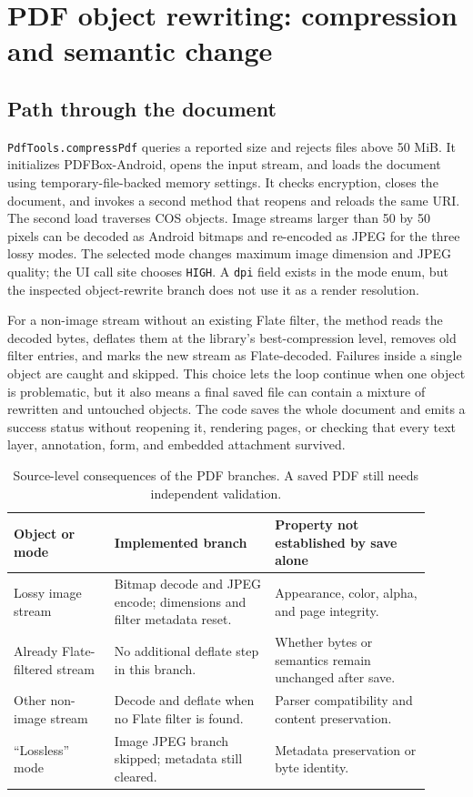\documentclass[10pt,letterpaper]{article}
\begin{document}
\section{PDF object rewriting: compression and semantic change}

\subsection{Path through the document}

\texttt{PdfTools.compressPdf} queries a reported size and rejects files above 50 MiB. It initializes PDFBox-Android, opens the input stream, and loads the document using temporary-file-backed memory settings. It checks encryption, closes the document, and invokes a second method that reopens and reloads the same URI. The second load traverses COS objects. Image streams larger than 50 by 50 pixels can be decoded as Android bitmaps and re-encoded as JPEG for the three lossy modes. The selected mode changes maximum image dimension and JPEG quality; the UI call site chooses \texttt{HIGH}. A \texttt{dpi} field exists in the mode enum, but the inspected object-rewrite branch does not use it as a render resolution.

For a non-image stream without an existing Flate filter, the method reads the decoded bytes, deflates them at the library's best-compression level, removes old filter entries, and marks the new stream as Flate-decoded. Failures inside a single object are caught and skipped. This choice lets the loop continue when one object is problematic, but it also means a final saved file can contain a mixture of rewritten and untouched objects. The code saves the whole document and emits a success status without reopening it, rendering pages, or checking that every text layer, annotation, form, and embedded attachment survived.

\begin{table}[H]
\centering\small
\caption{Source-level consequences of the PDF branches. A saved PDF still needs independent validation.}
\label{tab:pdfpaths}
\begin{tabular}{@{}>{\raggedright\arraybackslash}p{0.22\linewidth}>{\raggedright\arraybackslash}p{0.35\linewidth}>{\raggedright\arraybackslash}p{0.34\linewidth}@{}}
\toprule
Object or mode & Implemented branch & Property not established by save alone \\
\midrule
Lossy image stream & Bitmap decode and JPEG encode; dimensions and filter metadata reset. & Appearance, color, alpha, and page integrity. \\
Already Flate-filtered stream & No additional deflate step in this branch. & Whether bytes or semantics remain unchanged after save. \\
Other non-image stream & Decode and deflate when no Flate filter is found. & Parser compatibility and content preservation. \\
``Lossless'' mode & Image JPEG branch skipped; metadata still cleared. & Metadata preservation or byte identity. \\
\bottomrule
\end{tabular}
\end{table}
\end{document}
